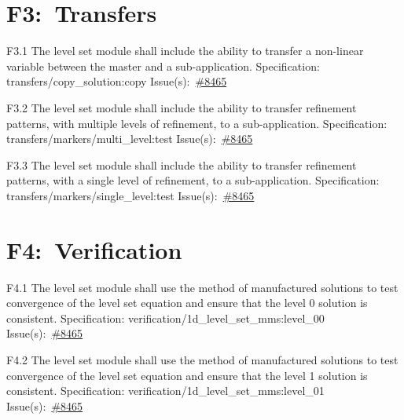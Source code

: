 \section*{F3:~Transfers}
\begin{Requirement}{F3.1}
The level set module shall include the ability to transfer a non-linear variable between the master and a sub-application.
\newline
Specification: transfers/copy\_solution:copy
\newline
Issue(s):~\href{https://github.com/idaholab/moose/issues/8465}{\#8465}
\end{Requirement}

\begin{Requirement}{F3.2}
The level set module shall include the ability to transfer refinement patterns, with multiple levels of refinement, to a sub-application.
\newline
Specification: transfers/markers/multi\_level:test
\newline
Issue(s):~\href{https://github.com/idaholab/moose/issues/8465}{\#8465}
\end{Requirement}

\begin{Requirement}{F3.3}
The level set module shall include the ability to transfer refinement patterns, with a single level of refinement, to a sub-application.
\newline
Specification: transfers/markers/single\_level:test
\newline
Issue(s):~\href{https://github.com/idaholab/moose/issues/8465}{\#8465}
\end{Requirement}
\section*{F4:~Verification}
\begin{Requirement}{F4.1}
The level set module shall use the method of manufactured solutions to test convergence of the level set equation and ensure that the level 0 solution is consistent.
\newline
Specification: verification/1d\_level\_set\_mms:level\_00
\newline
Issue(s):~\href{https://github.com/idaholab/moose/issues/8465}{\#8465}
\end{Requirement}

\begin{Requirement}{F4.2}
The level set module shall use the method of manufactured solutions to test convergence of the level set equation and ensure that the level 1 solution is consistent.
\newline
Specification: verification/1d\_level\_set\_mms:level\_01
\newline
Issue(s):~\href{https://github.com/idaholab/moose/issues/8465}{\#8465}
\end{Requirement}

